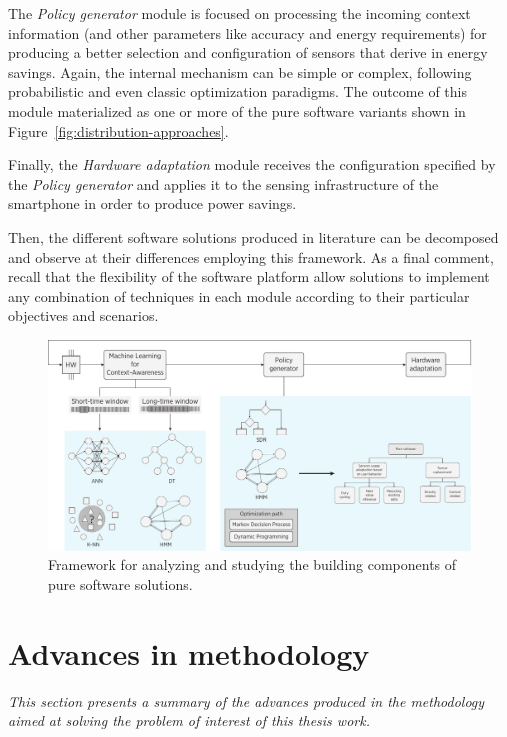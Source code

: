 \documentclass[ENG,PhD]{cinvestav}
\begin{document}
The \emph{Policy generator} module is focused on processing the incoming context information (and other parameters like accuracy and energy requirements) for producing a better selection and configuration of sensors that derive in energy savings.
Again, the internal mechanism can be simple or complex, following probabilistic and even classic optimization paradigms.
The outcome of this module materialized as one or more of the pure software variants shown in Figure~\ref{fig:distribution-approaches}.


Finally, the \emph{Hardware adaptation} module receives the configuration specified by the \emph{Policy generator} and applies it to the sensing infrastructure of the smartphone in order to produce power savings.

Then, the different software solutions produced in literature can be decomposed and observe at their differences employing this framework.
As a final comment, recall that the flexibility of the software platform allow solutions to implement any combination of techniques in each module according to their particular objectives and scenarios.

\begin{figure}[t]
  \centering
  \includegraphics[width=\textwidth]{dual-taxonomy-clean}
  \caption{Framework for analyzing and studying the building components of pure software solutions.}
  \label{fig:framework-pure-software-solutions}
\end{figure}










\section{Advances in methodology}
\label{sec:methodology}
\emph{This section presents a summary of the advances produced in the methodology aimed at solving the problem of interest of this thesis work.}
\end{document}
